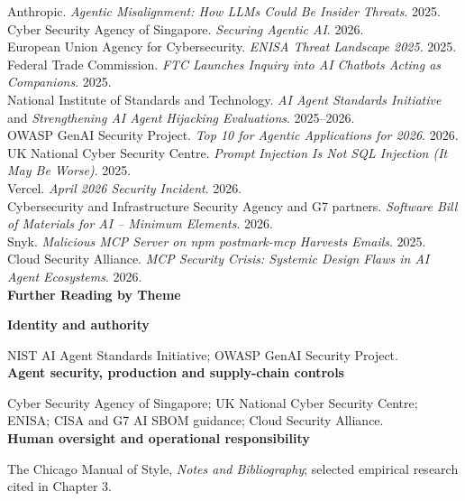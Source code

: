 \documentclass[10pt,twoside]{article}
\begin{document}
Anthropic. \emph{Agentic Misalignment: How LLMs Could Be Insider Threats}. 2025.\\
Cyber Security Agency of Singapore. \emph{Securing Agentic AI}. 2026.\\
European Union Agency for Cybersecurity. \emph{ENISA Threat Landscape 2025}. 2025.\\
Federal Trade Commission. \emph{FTC Launches Inquiry into AI Chatbots Acting as Companions}. 2025.\\
National Institute of Standards and Technology. \emph{AI Agent Standards Initiative} and \emph{Strengthening AI Agent Hijacking Evaluations}. 2025–2026.\\
OWASP GenAI Security Project. \emph{Top 10 for Agentic Applications for 2026}. 2026.\\
UK National Cyber Security Centre. \emph{Prompt Injection Is Not SQL Injection (It May Be Worse)}. 2025.\\
Vercel. \emph{April 2026 Security Incident}. 2026.\\
Cybersecurity and Infrastructure Security Agency and G7 partners. \emph{Software Bill of Materials for AI -- Minimum Elements}. 2026.\\
Snyk. \emph{Malicious MCP Server on npm postmark-mcp Harvests Emails}. 2025.\\
Cloud Security Alliance. \emph{MCP Security Crisis: Systemic Design Flaws in AI Agent Ecosystems}. 2026.\\[18pt]
{\sffamily\bfseries\large Further Reading by Theme}\par\vspace{8pt}
{\sffamily\bfseries Identity and authority}\par NIST AI Agent Standards Initiative; OWASP GenAI Security Project.\\[6pt]
{\sffamily\bfseries Agent security, production and supply-chain controls}\par Cyber Security Agency of Singapore; UK National Cyber Security Centre; ENISA; CISA and G7 AI SBOM guidance; Cloud Security Alliance.\\[6pt]
{\sffamily\bfseries Human oversight and operational responsibility}\par The Chicago Manual of Style, \emph{Notes and Bibliography}; selected empirical research cited in Chapter 3.\\
\end{document}
